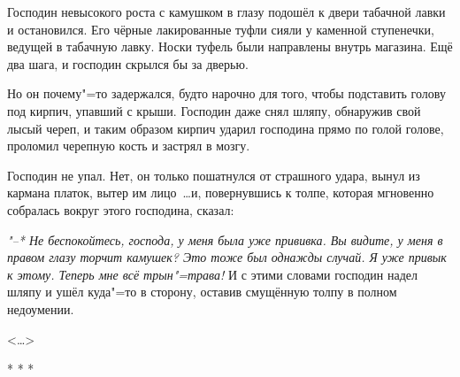 Господин невысокого роста с камушком в глазу подошёл к двери табачной лавки и остановился. Его чёрные лакированные туфли сияли у каменной ступенечки, ведущей в табачную лавку. Носки туфель были направлены внутрь магазина. Ещё два шага, и господин скрылся бы за дверью.

Но он почему"=то задержался, будто нарочно для того, чтобы подставить голову под кирпич, упавший с крыши. Господин даже снял шляпу, обнаружив свой лысый череп, и таким образом кирпич ударил господина прямо по голой голове, проломил черепную кость и застрял в мозгу.

Господин не упал. Нет, он только пошатнулся от страшного удара, вынул из кармана платок, вытер им лицо~\dots и, повернувшись к толпе, которая мгновенно собралась вокруг этого господина, сказал:

\textit{"--* Не беспокойтесь, господа, у меня была уже прививка. Вы видите, у меня в правом глазу торчит камушек? Это тоже был однажды случай. Я уже привык к этому. Теперь мне всё трын"=трава!} И с этими словами господин надел шляпу и ушёл куда"=то в сторону, оставив смущённую толпу в полном недоумении.

\begin{flushright}
<\dots{}>
\end{flushright}

\begin{center}
* * * 
\end{center}